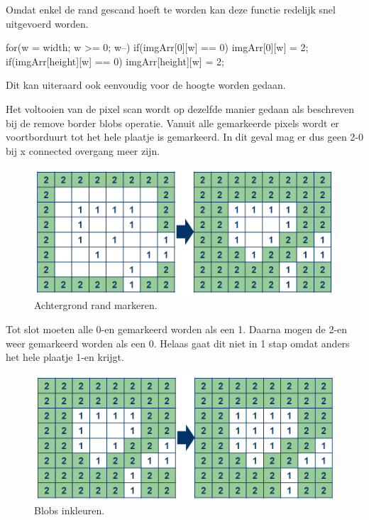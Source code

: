 Omdat enkel de rand gescand hoeft te worden kan deze functie redelijk snel
uitgevoerd worden.

\begin{cppcode}
for(w = width; w >= 0; w--){
	if(imgArr[0][w] == 0){
        imgArr[0][w] = 2;
    }
    if(imgArr[height][w] == 0){
        imgArr[height][w] = 2;
    }
}
\end{cppcode}
Dit kan uiteraard ook eenvoudig voor de hoogte worden gedaan.

Het voltooien van de pixel scan wordt op dezelfde manier gedaan als beschreven
bij de remove border blobs operatie. Vanuit alle gemarkeerde pixels wordt er
voortborduurt tot het hele plaatje is gemarkeerd. In dit geval mag er dus geen
2-0 bij x connected overgang meer zijn.

\begin{figure}
    \begin{center}
        \includegraphics[scale=0.5]{figures/fill_holes_step2.png}
    \end{center}
    \caption{Achtergrond rand markeren.}
    \label{fig:fhstep2}
\end{figure}

Tot slot moeten alle 0-en gemarkeerd worden als een 1. Daarna mogen de 2-en
weer gemarkeerd worden als een 0. Helaas gaat dit niet in 1 stap omdat anders
het hele plaatje 1-en krijgt.

\begin{figure}
    \begin{center}
        \includegraphics[scale=0.5]{figures/fill_holes_step3.png}
    \end{center}
    \caption{Blobs inkleuren.}
    \label{fig:fhstep3}
\end{figure}

